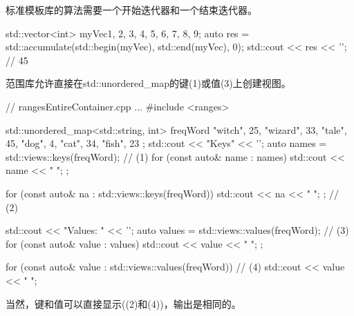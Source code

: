 标准模板库的算法需要一个开始迭代器和一个结束迭代器。

\begin{cpp}
std::vector<int> myVec{1, 2, 3, 4, 5, 6, 7, 8, 9};
auto res = std::accumulate(std::begin(myVec), std::end(myVec), 0);
std::cout << res << '\n'; // 45
\end{cpp}

范围库允许直接在std::unordered\_map的键(1)或值(3)上创建视图。


\begin{cpp}
// rangesEntireContainer.cpp
...
#include <ranges>

std::unordered_map<std::string, int> freqWord{ {"witch", 25}, {"wizard", 33},
											   {"tale", 45}, {"dog", 4},
											   {"cat", 34}, {"fish", 23} };
std::cout << "Keys" << '\n';
auto names = std::views::keys(freqWord); // (1)
for (const auto& name : names){ std::cout << name << " "; };

for (const auto& na : std::views::keys(freqWord)){ std::cout << na << " "; }; // (2)

std::cout << "Values: " << '\n';
auto values = std::views::values(freqWord); // (3)
for (const auto& value : values){ std::cout << value << " "; };

for (const auto& value : std::views::values(freqWord)){ // (4)
	std::cout << value << " ";
}
\end{cpp}

当然，键和值可以直接显示((2)和(4))，输出是相同的。



























